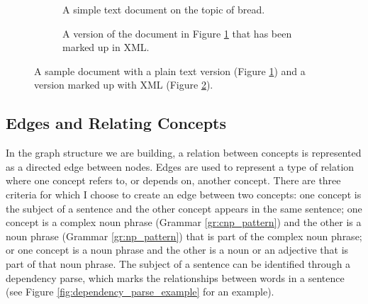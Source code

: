 \documentclass[12pt]{article}
\theoremstyle{grammarstyle}
\begin{document}
\begin{figure}
    \centering

    \begin{subfigure}{\linewidth}
        \lstset{breaklines=true, numbers=none, breakindent=0mm}
        
        \caption{A simple text document on the topic of bread.}
        \label{fig:sample_txt_document}
    \end{subfigure}

    \vspace{5mm}

    \begin{subfigure}{\linewidth}
        \centering
        
        \caption{A version of the document in Figure \ref{fig:sample_txt_document} that has been marked up in XML.}
        \label{fig:sample_xml_document}
    \end{subfigure}

    \caption{A sample document with a plain text version (Figure \ref{fig:sample_txt_document}) and a version marked up with XML (Figure \ref{fig:sample_xml_document}).}
    \label{fig:sample document}
\end{figure}

\subsection{Edges and Relating Concepts} \label{sec:edges_and_relating_concepts}
In the graph structure we are building, a relation between concepts is represented as a directed edge between nodes. Edges are used to represent a type of relation where one concept refers to, or depends on, another concept. There are three criteria for which I choose to create an edge between two concepts: one concept is the subject of a sentence and the other concept appears in the same sentence; one concept is a complex noun phrase (Grammar \ref{gr:cnp_pattern}) and the other is a noun phrase (Grammar \ref{gr:np_pattern}) that is part of the complex noun phrase; or one concept is a noun phrase and the other is a noun or an adjective that is part of that noun phrase. The subject of a sentence can be identified through a dependency parse, which marks the relationships between words in a sentence (see Figure \ref{fig:dependency_parse_example} for an example).
\end{document}

